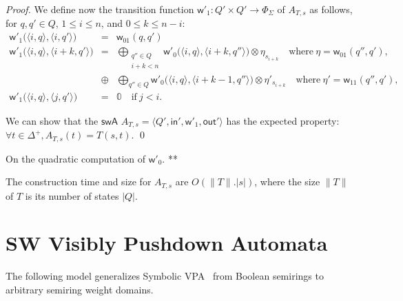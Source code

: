 \documentclass[runningheads]{llncs}
\def\<#1>{\langle #1 \rangle}
\newcommand{\zero}{\mathbb{0}}
\def\SWA{\textsf{swA}\xspace}
\def\wei{\mathsf{w}}
\def\init{\mathsf{in}}
\def\final{\mathsf{out}}
\begin{document}
\begin{proof}
\noindent
We define now the transition function 
$\wei'_1: Q' \times Q' \to \Phi_\Sigma$
of $A_{T, s}$ as follows,
for $q, q' \in Q$,
$1 \leq i \leq n$, and $0 \leq k \leq n-i$:
\[
\begin{array}{lcl}
\wei'_1\bigl(\< i, q>, \< i, q'>\bigr) & = & \wei_{01}(q, q')\\
%
\wei'_1\bigl(\< i, q>, \< i+k, q'>\bigr) & = & 
\displaystyle
\bigoplus_{\begin{array}{c}
           \scriptstyle q'' \in Q\\[-2pt]
           \scriptstyle i+k < n
           \end{array}} 
\wei'_0\bigl(\<i, q>, \< i+k, q''>\bigr) \otimes \eta_{s_{i+k}}
\quad \mathrm{where~} \eta = \wei_{01}(q'', q'),\\
 & \oplus & \displaystyle
\bigoplus_{q'' \in Q} \wei'_0\bigl(\<i, q>, \< i+k-1, q''>\bigr) \otimes \eta'_{s_{i+k}}
\quad \mathrm{where~}\eta' = \wei_{11}(q'', q'),\\
%
\wei'_1\bigl(\< i, q>, \< j, q'>\bigr) & = & \zero  
\quad \mathrm{if~} j < i.
\end{array}      
\]
%

\noindent
We can show that the $\SWA$ $A_{T, s} = \< Q', \init', \wei'_1, \final' >$
has the expected property: $\forall t \in \Delta^+, A_{T, s}(t) = T(s, t)$.
\qed
\end{proof}

\noindent
On the quadratic computation of $\wei'_0$. **


\noindent
The construction time and size for $A_{T, s}$ are $O(\| T \| . | s |)$,
where the size $\| T \|$ of $T$ is its number of states $|Q|$.

 







\section{SW Visibly Pushdown Automata}
\label{section:SWVPA}\label{sec:SWVPA}
The following model generalizes Symbolic VPA~\cite{dAntonyAlur14SVPDA}
from Boolean semirings to arbitrary semiring weight domains.
\end{document}
